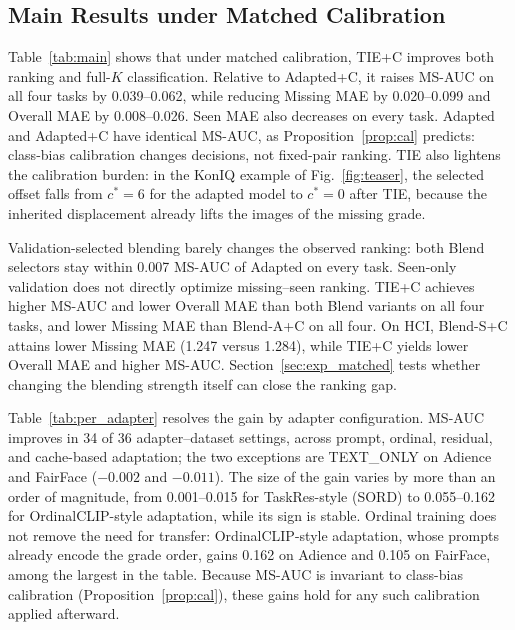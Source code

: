 \subsection{Main Results under Matched Calibration}
\label{sec:exp_main}

\setcounter{table}{3}

\setcounter{table}{1}

Table~\ref{tab:main} shows that under matched calibration, TIE+C improves both ranking and full-$K$ classification. Relative to Adapted+C, it raises MS-AUC on all four tasks by 0.039--0.062, while reducing Missing MAE by 0.020--0.099 and Overall MAE by 0.008--0.026. Seen MAE also decreases on every task. Adapted and Adapted+C have identical MS-AUC, as Proposition~\ref{prop:cal} predicts: class-bias calibration changes decisions, not fixed-pair ranking.
TIE also lightens the calibration burden: in the KonIQ example of Fig.~\ref{fig:teaser}, the selected offset falls from $c^*=6$ for the adapted model to $c^*=0$ after TIE, because the inherited displacement already lifts the images of the missing grade.

Validation-selected blending barely changes the observed ranking: both Blend selectors stay within 0.007 MS-AUC of Adapted on every task. Seen-only validation does not directly optimize missing--seen ranking. TIE+C achieves higher MS-AUC and lower Overall MAE than both Blend variants on all four tasks, and lower Missing MAE than Blend-A+C on all four. On HCI, Blend-S+C attains lower Missing MAE (1.247 versus 1.284), while TIE+C yields lower Overall MAE and higher MS-AUC. Section~\ref{sec:exp_matched} tests whether changing the blending strength itself can close the ranking gap.

Table~\ref{tab:per_adapter} resolves the gain by adapter configuration.
MS-AUC improves in 34 of 36 adapter--dataset settings, across prompt, ordinal, residual, and cache-based adaptation; the two exceptions are TEXT\_ONLY on Adience and FairFace ($-0.002$ and $-0.011$).
The size of the gain varies by more than an order of magnitude, from 0.001--0.015 for TaskRes-style (SORD) to 0.055--0.162 for OrdinalCLIP-style adaptation, while its sign is stable.
Ordinal training does not remove the need for transfer: OrdinalCLIP-style adaptation, whose prompts already encode the grade order, gains 0.162 on Adience and 0.105 on FairFace, among the largest in the table.
Because MS-AUC is invariant to class-bias calibration (Proposition~\ref{prop:cal}), these gains hold for any such calibration applied afterward.

